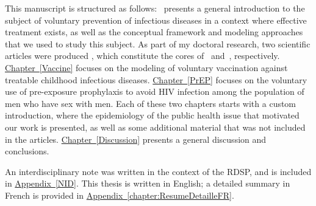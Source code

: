 This manuscript is structured as follows:~ presents a general introduction to the subject of voluntary prevention of infectious diseases in a context where effective treatment exists, as well as the conceptual framework and modeling approaches that we used to study this subject. As part of my doctoral research, two scientific articles were 
produced \cite[]{Jijon2017,Jijon2021}, which constitute the cores of~ and~, respectively. \hyperlink{Vaccine}{Chapter~\ref*{Vaccine}} focuses on the modeling of voluntary vaccination against treatable childhood infectious diseases. \hyperlink{PrEP}{Chapter~\ref*{PrEP}} focuses on the voluntary use of pre-exposure prophylaxis to avoid HIV infection among the population of men who have sex with men. Each of these two chapters starts with a custom introduction, where the epidemiology of the public health issue that motivated our work is presented, as well as some additional material that was not included in the articles. \hyperlink{Discussion}{Chapter~\ref*{Discussion}} presents a general discussion and conclusions. 

An interdisciplinary note was written in the context of the RDSP, and is included in \hyperlink{NID}{Appendix~\ref*{NID}}. This thesis is written in English; a detailed summary in French is provided in \hyperlink{chapter:ResumeDetailleFR}{Appendix~\ref*{chapter:ResumeDetailleFR}}.